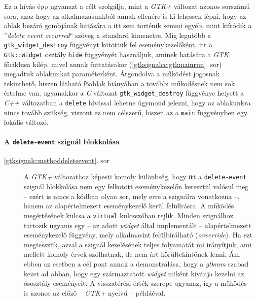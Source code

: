 \begin{description}
Ez a hívás épp ugyanazt a célt szolgálja, mint a \textit{GTK+} változat azonos sorszámú sora, azaz hogy az alkalmazásunkból annak ellenére is ki lehessen lépni, hogy az ablak bezáró gombjának hatására a itt sem történik semmi egyéb, mint kiíródik a ''\textit{delete event occurred}`` szöveg a standard kimenetre. Míg legutóbb a \texttt{gtk\_widget\_destroy} függvényt kötöttük fel eseménykezelőként, itt a \texttt{Gtk::Widget} osztály \texttt{hide} függvényét használjuk, aminek hatására a \textit{GTK} főciklusa kilép, mivel annak futtatásakor (\ref{gtksignalcc:gtkmainrun}. sor) megadtuk ablakunkat paraméterként. Átgondolva a működést jogosnak tekinthető, hiszen látható főablak hiányában a további működésnek nem sok értelme van, ugyanakkor a \textit{C} változat \texttt{gtk\_widget\_destroy} függvénye helyett a \textit{C++} változatban a \texttt{delete} hívással lehetne úgymond jelezni, hogy az ablakunkra nincs tovább szükség, viszont ez nem célszerű, hiszen az a \texttt{main} függvényben egy lokális változó.
\end{description}

\paragraph{A \texttt{delete-event} szignál blokkolása}

\begin{description}
 \item[\ref{gtksignalc:methoddeleteevent}. sor] A \textit{GTK+} változathoz képesti komoly különbség, hogy itt a \texttt{delete-event} szignál blokkolása nem egy felkötött eseménykezelőn keresztül valósul meg -- ezért is nincs a kódban olyan sor, mely erre a szignálra vonatkozna --, hanem az alapértelmezett eseménykezelő kerül felülírásra. A működés megértésének kulcsa a \texttt{virtual} kulcsszóban rejlik. Minden szignálhoz tartozik ugyanis egy -- az adott \textit{widget} által implementált -- alapértelmezett eseménykezelő függvény, mely alkalmasint felülbírálható (\textit{ovverride}). Ha ezt megtesszük, azzal a szignál kezelésének teljes folyamatát mi irányítjuk, ami mellett komoly érvek szólhatnak, de nem árt körültekintőnek lenni. Ám ebben az esetben a cél pont annak a demonstrálása, hogy a \textit{gtkmm} szabad kezet ad abban, hogy egy származtatott \textit{widget} miként kívánja kezelni az ősosztály eseményeit. A visszatérési érték szerepe ugyanaz, így a működés is azonos az előző -- \textit{GTK+} nyelvű -- példáéval.
\end{description}


